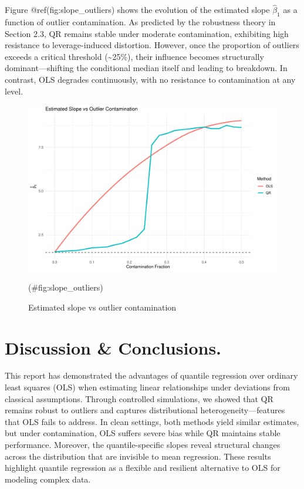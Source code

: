\documentclass[fleqn,10pt]{latex/stylish_article} %
\begin{document}
Figure @ref(fig:slope\_outliers) shows the evolution of the estimated slope \(\hat{\beta}_1\) as a function of outlier contamination. As predicted by the robustness theory in Section 2.3, QR remains stable under moderate contamination, exhibiting high resistance to leverage-induced distortion. However, once the proportion of outliers exceeds a critical threshold (\textasciitilde25\%), their influence becomes structurally dominant---shifting the conditional median itself and leading to breakdown. In contrast, OLS degrades continuously, with no resistance to contamination at any level.

\begin{figure}

{\centering \includegraphics[width=0.8\linewidth]{ADR_project_draft_files/figure-latex/slope_outliers-1} 

}

\caption{Estimated slope vs outlier contamination}(\#fig:slope_outliers)
\end{figure}

\section{Discussion \& Conclusions.}\label{discussion-conclusions.}

This report has demonstrated the advantages of quantile regression over ordinary least squares (OLS) when estimating linear relationships under deviations from classical assumptions. Through controlled simulations, we showed that QR remains robust to outliers and captures distributional heterogeneity---features that OLS fails to address. In clean settings, both methods yield similar estimates, but under contamination, OLS suffers severe bias while QR maintains stable performance. Moreover, the quantile-specific slopes reveal structural changes across the distribution that are invisible to mean regression. These results highlight quantile regression as a flexible and resilient alternative to OLS for modeling complex data.
\end{document}
